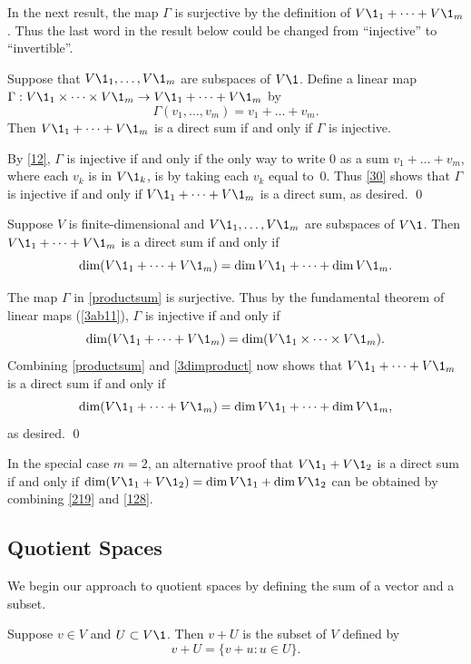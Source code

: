 In the next result, the map $\Gamma$ is surjective by the definition of $V\1_1 + \dots + V\1_m$. Thus the last word in the result below could be changed from ``injective'' to ``invertible''\!.

{Suppose that $V\1_1, \dots, V\1_m$ are subspaces of $V\1$. Define a linear map \mbox{$\Gamma: V\1_1 \times \dots \times V\1_m \to V\1_1 + \dots + V\1_m$} by
\[
\Gamma(v_1, \dots, v_m) = v_1 + \dots + v_m.
\]
Then $V\1_1 + \dots + V\1_m$ is a direct sum if and only if $\Gamma$ is injective.
}

\proof
By \ref{12}, $\Gamma$ is injective if and only if the only way to write $0$ as a sum $v_1 + \dots + v_m$, where each $v_k$ is in $V\1_k$, is by taking each $v_k$ equal to~$0$. Thus \ref{30} shows that $\Gamma$ is injective if and only if $V\1_1 + \dots + V\1_m$ is a direct sum, as desired. \qed

{Suppose $V$ is finite-dimensional and $V\1_1, \dots, V\1_m$ are subspaces of $V\1$. Then $V\1_1 + \dots + V\1_m$ is a direct sum if and only if
\[
\dim(V\1_1 + \dots + V\1_m) = \dim V\1_1 + \dots + \dim V\1_m.
\]
}

\proof
The map $\Gamma$ in \ref{productsum} is surjective. Thus by the fundamental theorem of linear maps (\ref{3ab11}), $\Gamma$ is injective if and only if
\[
\dim(V\1_1 + \dots + V\1_m) = \dim (V\1_1 \times \dots \times V\1_m).
\]
Combining \ref{productsum} and \ref{3dimproduct} now shows that $V\1_1 + \dots + V\1_m$ is a direct sum if and only if
\[
\dim(V\1_1 + \dots + V\1_m) = \dim V\1_1 + \dots + \dim V\1_m,
\]
as desired. \qed

In the special case $m = 2$, an alternative proof that $V\1_1 + V\1_2$ is a direct sum if and only if $\dim(V\1_1 + V\1_2) = \dim V\1_1 + \dim V\1_2$ can be obtained by combining \ref{219} and \ref{128}.

\subsection{Quotient Spaces}

We begin our approach to quotient spaces by defining the sum of a vector and a subset.

{Suppose $v \in V$ and $U \subset V\1$. Then $v + U$ is the subset of $V$ defined by
\[
v + U = \{ v + u: u \in U\}.
\]
}

